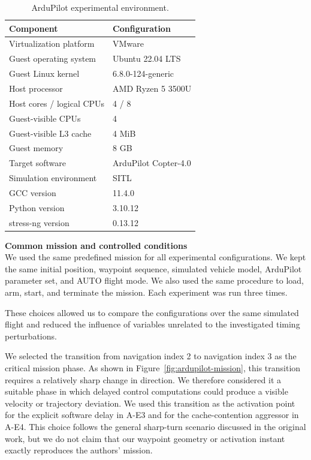 \begin{table}[t]
    \centering
    \caption{ArduPilot experimental environment.}
    \label{tab:ardupilot-env}
    \small
    \begin{tabular}{ll}
        \toprule
        Component & Configuration \\
        \midrule
        Virtualization platform & VMware  \\
        Guest operating system & Ubuntu 22.04 LTS \\
        Guest Linux kernel & 6.8.0-124-generic \\
        Host processor &
            AMD Ryzen 5 3500U \\
        Host cores / logical CPUs & 4 / 8 \\
        Guest-visible CPUs & 4 \\
        Guest-visible L3 cache & 4 MiB \\
        Guest memory & 8 GB \\
        Target software & ArduPilot Copter-4.0 \\
        Simulation environment & SITL \\
        GCC version & 11.4.0 \\
        Python version & 3.10.12 \\
        stress-ng version & 0.13.12 \\
        \bottomrule
    \end{tabular}
\end{table}

\noindent \textbf{Common mission and controlled conditions} \\
\noindent We used the same predefined mission for all experimental configurations. We kept the same initial position, waypoint sequence, simulated vehicle model, ArduPilot parameter set, and AUTO flight mode. We also used the same procedure to load, arm, start, and terminate the mission. Each experiment was run three times.

\noindent These choices allowed us to compare the configurations over the same simulated flight and reduced the influence of variables unrelated to the investigated timing perturbations.

\noindent We selected the transition from navigation index 2 to navigation index 3 as the critical mission phase. As shown in Figure~\ref{fig:ardupilot-mission}, this transition requires a
relatively sharp change in direction. We therefore considered it a suitable phase in which delayed control computations could produce a visible velocity or trajectory deviation. We used this transition as the activation point for the explicit software delay in A-E3 and for the cache-contention aggressor in A-E4. This choice follows the general sharp-turn scenario discussed in the original work, but we do not claim that our waypoint geometry or activation instant exactly reproduces the authors' mission.

